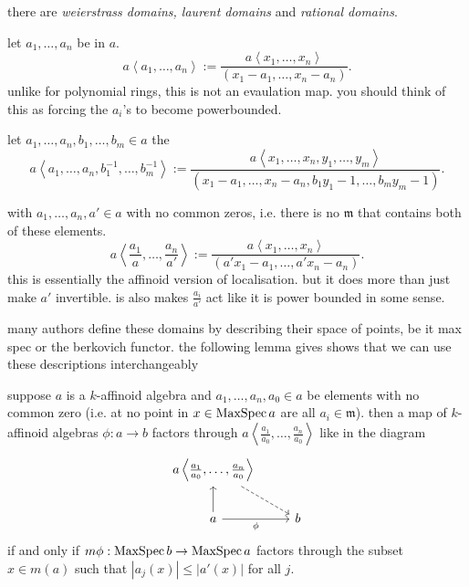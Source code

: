 \begin{definition}
		there are \emph{weierstrass domains, laurent domains} and \emph{rational domains}. 
	\begin{description}
		\item[weierstrass domain] let $a_1, \ldots, a_n$ be in $a$. 
			\[
				a\left<a_1, \ldots, a_n \right> := \frac{a\left<x_1, \ldots, x_n \right>}{(x_1-a_1, \ldots, x_n - a_n)}
			.\] 
			unlike for polynomial rings, this is not an evaulation map. you should think of this as forcing the $a_i$'s to become powerbounded. 
		\item [laurent domains]
			let $a_1, \ldots, a_n, b_1, \ldots, b_m \in a$ the \[
				a\left<a_1, \ldots, a_n, b_1^{-1}, \ldots, b_m^{-1} \right> := \frac{a\left<x_1, \ldots, x_n,y_1, \ldots, y_m  \right>}{(x_1 - a_1, \ldots, x_n - a_n, b_1 y_1 - 1, \ldots, b_m y_m - 1)}
			.\] 
		\item[rational domain] with $a_1, \ldots, a_n, a' \in a$ with no common zeros, i.e. there is no $\mathfrak{m} $ that contains both of these elements.   
			\[
				a \left<\frac{a_1}{a}, \ldots, \frac{a_n}{a'} \right> := \frac{a\left<x_1, \ldots, x_n \right>}{(a' x_1 - a_1, \ldots, a' x_n - a_n)}
			.\] 
			this is essentially the affinoid version of localisation.
			but it does more than just make $a'$ invertible. 
			is also makes $\frac{a_i}{ a'}$ act like it is power bounded in some sense. 
		\item 
	\end{description}

\end{definition}
many authors define these domains by describing their space of points, be it max spec or the berkovich functor. 
the following lemma gives shows that we can use these descriptions interchangeably
\begin{lemma}
	suppose $a$ is a $k$-affinoid algebra and $a_1, \ldots, a_n, a_0 \in a$ be elements with no common zero (i.e. at no point in $ x \in \operatorname{MaxSpec} a$ are all $a_{i} \in \mathfrak{m}$).
	 then a map of $k$-affinoid algebras $\phi: a \to b$ factors through $a \left<\frac{a_1}{a_0}, \ldots, \frac{a_n}{a_0} \right>$ like in the diagram \[
	 \begin{tikzcd}
		 a \left<\frac{a_1}{a_0}, \ldots, \frac{a_n}{a_0} \right> \drar[dashed]  \\
		 a \uar \rar[']{\phi} & b
	 \end{tikzcd}
	 \] 
	 if and only if  $m\phi: \operatorname{MaxSpec} b \to \operatorname{MaxSpec} a$ factors through the subset $x \in m(a)$ such that $|a_j(x)| \le |a'(x)|$ for all $j$. 
\end{lemma}

